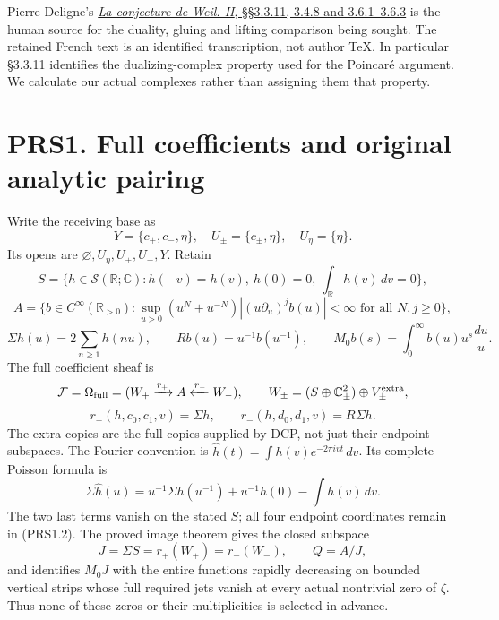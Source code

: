 Pierre Deligne's
\href{https://www.numdam.org/item/PMIHES_1980__52__137_0/}{\emph{La
conjecture de Weil. II}, §§3.3.11, 3.4.8 and 3.6.1--3.6.3} is the human
source for the duality, gluing and lifting comparison being sought. The
retained French text is an identified transcription, not author TeX. In
particular §3.3.11 identifies the dualizing-complex property used for
the Poincaré argument. We calculate our actual complexes rather than
assigning them that property.

\section{PRS1. Full coefficients and original analytic
pairing}\label{prs1.-full-coefficients-and-original-analytic-pairing}

Write the receiving base as \[
Y=\{c_+,c_-,\eta\},\quad U_\pm=\{c_\pm,\eta\},\quad U_\eta=\{\eta\}.
\] Its opens are \(\varnothing,U_\eta,U_+,U_-,Y\). Retain \[
S=\{h\in\mathcal S(\mathbb R;\mathbb C):h(-v)=h(v),\ h(0)=0,\ \int_{\mathbb R}h(v)\,dv=0\},
\] \[
A=\{b\in C^\infty(\mathbb R_{>0}):\sup_{u>0}(u^N+u^{-N})|(u\partial_u)^jb(u)|<\infty\text{ for all }N,j\geq0\},
\] \[
\Sigma h(u)=2\sum_{n\geq1}h(nu),\qquad Rb(u)=u^{-1}b(u^{-1}),\qquad
M_0b(s)=\int_0^\infty b(u)u^s\frac{du}{u}.
\tag{PRS1.1}
\] The full coefficient sheaf is \[
\mathcal F=\Omega_{\rm full}=(W_+\xrightarrow{r_+}A\xleftarrow{r_-}W_-),\qquad
W_\pm=(S\oplus\mathbb C^2_\pm)\oplus V_\pm^{\rm extra},
\] \[
r_+(h,c_0,c_1,v)=\Sigma h,\qquad r_-(h,d_0,d_1,v)=R\Sigma h.
\tag{PRS1.2}
\] The extra copies are the full copies supplied by DCP, not just their
endpoint subspaces. The Fourier convention is
\(\widehat h(t)=\int h(v)e^{-2\pi ivt}\,dv\). Its complete Poisson
formula is \[
\Sigma\widehat h(u)=u^{-1}\Sigma h(u^{-1})+u^{-1}h(0)-\int h(v)\,dv.
\tag{PRS1.3}
\] The two last terms vanish on the stated \(S\); all four endpoint
coordinates remain in (PRS1.2). The proved image theorem gives the
closed subspace \[
J=\Sigma S=r_+(W_+)=r_-(W_-),\qquad Q=A/J,
\] and identifies \(M_0J\) with the entire functions rapidly decreasing
on bounded vertical strips whose full required jets vanish at every
actual nontrivial zero of \(\zeta\). Thus none of these zeros or their
multiplicities is selected in advance.

